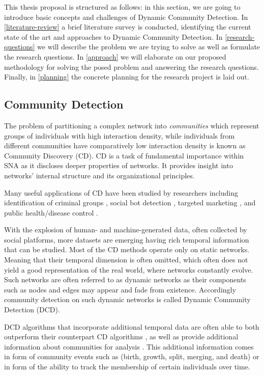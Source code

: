 \documentclass[
acmsmall,
nonacm,
screen,
acmthm]{acmart}
\begin{document}
This thesis proposal is structured as follows: in this section, we are
going to introduce basic concepts and challenges of Dynamic Community
Detection. In \cref{literature-review} a brief literature survey is
conducted, identifying the current state of the art and approaches to
Dynamic Community Detection. In \cref{research-questions} we will
describe the problem we are trying to solve as well as formulate the
research questions. In \cref{approach} we will elaborate on our proposed
methodology for solving the posed problem and answering the research
questions. Finally, in \cref{planning} the concrete planning for the
research project is laid out.

\hypertarget{community-detection}{%
\subsection{Community Detection}\label{community-detection}}

The problem of partitioning a complex network into \emph{communities}
which represent groups of individuals with high interaction density,
while individuals from different communities have comparatively low
interaction density is known as Community Discovery (CD). CD is a task
of fundamental importance within SNA as it discloses deeper properties
of networks. It provides insight into networks' internal structure and
its organizational principles.

Many useful applications of CD have been studied by researchers
including identification of criminal groups
\citep{sarvariConstructingAnalyzingCriminal2014}, social bot detection
\citep{karatasReviewSocialBot2017}, targeted marketing
\citep{mosadeghUsingSocialNetwork2011}, and public health/disease
control \citep{salatheDynamicsControlDiseases2010}.

With the explosion of human- and machine-generated data, often collected
by social platforms, more datasets are emerging having rich temporal
information that can be studied. Most of the CD methods operate only on
static networks. Meaning that their temporal dimension is often omitted,
which often does not yield a good representation of the real world,
where networks constantly evolve. Such networks are often referred to as
dynamic networks as their components such as nodes and edges may appear
and fade from existence. Accordingly community detection on such dynamic
networks is called Dynamic Community Detection (DCD).

DCD algorithms that incorporate additional temporal data are often able
to both outperform their counterpart CD algorithms
\citep{granellBenchmarkModelAssess2015, liuCommunityDetectionMultiPartite2016, faniUserCommunityDetection2020, rossettiANGELEfficientEffective2020},
as well as provide additional information about communities for analysis
\citep{pallaQuantifyingSocialGroup2007}. This additional information
comes in form of community events such as (birth, growth, split,
merging, and death) or in form of the ability to track the membership of
certain individuals over time.
\end{document}
